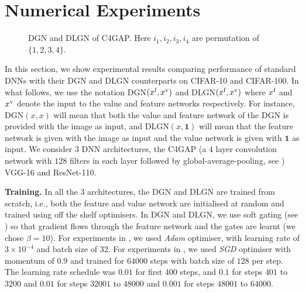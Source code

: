 \section{Numerical Experiments}\label{sec:dlgn}
\begin{figure}[!b]
\centering
\begin{minipage}{0.40\columnwidth}
\centering
\resizebox{0.99\columnwidth}{!}{

}
\end{minipage}
\begin{minipage}{0.40\columnwidth}
\centering
\resizebox{0.99\columnwidth}{!}{

}
\end{minipage}
%
\caption{DGN and DLGN of C4GAP. Here $i_1,i_2,i_3,i_4$ are permutation of $\{1,2,3,4\}$.}
\label{fig:c4gap}
\end{figure}

In this section, we show experimental results comparing performance of standard DNNs with their DGN and DLGN counterparts on CIFAR-10 and CIFAR-100. In what follows, we use the notation DGN$(x^{\text{f}},x^{\text{v}})$ and DLGN$(x^{\text{f}},x^{\text{v}})$ where $x^{\text{f}}$ and $x^{\text{v}}$ denote the input to the value and feature networks respectively. For instance, DGN$(x,x)$ will mean that both the value and feature network of the DGN is provided with the image as input, and DLGN$(x,\mathbf{1})$ will mean that the feature network is given with the image as input and the value network is given with $\mathbf{1}$ as input. We consider $3$ DNN architectures, the C4GAP (a $4$ layer convolution network with $128$ filters in each layer followed by global-average-pooling, see ) VGG-16 and ResNet-110. %

\textbf{Training.} In all the $3$ architectures, the DGN and DLGN are trained from scratch, i.e., both the feature and value network are initialised at random and trained using off the shelf optimisers. In DGN and DLGN, we use soft gating (see ) so that gradient flows through the feature network and the gates are learnt (we chose $\beta=10$). For experiments in , we used \emph{Adam} optimiser, with learning rate of $3\times 10^{-4}$ and batch size of $32$. For  experiments in , we used  \emph{SGD} optimiser with momentum of $0.9$ and trained for $64000$ steps with batch size of $128$ per step. The learning rate schedule was $0.01$ for first $400$ steps, and $0.1$ for steps $401$ to $3200$ and $0.01$ for steps $32001$ to $48000$ and $0.001$ for steps $48001$ to $64000$.

